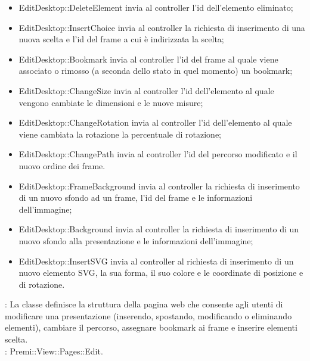 {{\begin{itemize}
				\item EditDesktop::DeleteElement invia al controller l'id dell'elemento eliminato;
				\item EditDesktop::InsertChoice invia al controller la richiesta di inserimento di una nuova scelta e l'id del frame a cui è indirizzata la scelta;
				\item EditDesktop::Bookmark invia al controller l'id del frame al quale viene associato o rimosso (a seconda dello stato in quel momento) un bookmark;
				\item EditDesktop::ChangeSize invia al controller l'id dell'elemento al quale vengono cambiate le dimensioni e le nuove misure;
				\item EditDesktop::ChangeRotation invia al controller l'id dell'elemento al quale viene cambiata la rotazione la percentuale di rotazione;
				\item EditDesktop::ChangePath invia al controller l'id del percorso modificato e il nuovo ordine dei frame.
				\item EditDesktop::FrameBackground invia al controller la richiesta di inserimento di un nuovo sfondo ad un frame, l'id del frame e le informazioni dell'immagine;
				\item EditDesktop::Background invia al controller la richiesta di inserimento di un nuovo sfondo alla presentazione e le informazioni dell'immagine;
				\item EditDesktop::InsertSVG invia al controller al richiesta di inserimento di un nuovo elemento SVG, la sua forma, il suo colore e le coordinate di posizione e di rotazione.
			\end{itemize}
			\textbf{\attivita}: La classe definisce la struttura della pagina web che consente agli utenti di modificare una presentazione (inserendo, spostando, modificando o eliminando elementi), cambiare il percorso, assegnare bookmark ai frame e inserire elementi scelta.\\
			\textbf{\base}: Premi::View::Pages::Edit.
		}
}
